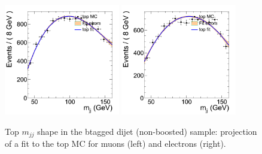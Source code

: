 \begin{figure}
\begin{center}
\includegraphics[width=0.45\textwidth]{figs/wpj/DibosonBtaglnujj_top_muon_2jets.png}
\includegraphics[width=0.45\textwidth]{figs/wpj/DibosonBtaglnujj_top_electron_2jets.png}
\end{center}
\caption{\label{fig:topFit} Top $m_{jj}$ shape in the btagged dijet (non-boosted) sample: projection of a fit to the top MC for muons (left) and electrons (right).}
\label{fig:topFit_Dijet_btag}
\end{figure}
